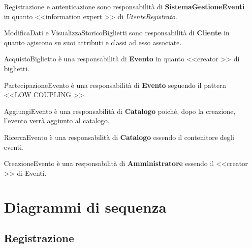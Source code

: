 \begin{description}
	\item Registrazione e autenticazione sono responsabilità di \textbf{SistemaGestioneEventi} in quanto \textless\textless information expert \textgreater\textgreater{} di \textit{UtenteRegistrato}.
	
	\item ModificaDati e VisualizzaStoricoBiglietti sono responsabilità di \textbf{Cliente} in quanto agiscono su suoi attributi e classi ad esso associate.
	
	\item AcquistoBiglietto è una responsabilità di \textbf{Evento} in quanto \textless\textless creator \textgreater\textgreater{} di biglietti.
	
	\item PartecipazioneEvento è una responsabilità di \textbf{Evento} seguendo il pattern \textless\textless LOW COUPLING \textgreater\textgreater.
	
	\item AggiungiEvento è una responsabilità di \textbf{Catalogo} poiché, dopo la creazione, l’evento verrà aggiunto al catalogo.
	
	\item RicercaEvento è una responsabilità di \textbf{Catalogo} essendo il contenitore degli eventi.
	
	\item CreazioneEvento è una responsabilità di \textbf{Amministratore} essendo il \textless\textless creator \textgreater\textgreater{} di Eventi.
  \end{description}


\clearpage


\section{Diagrammi di sequenza}


\subsection{Registrazione}

